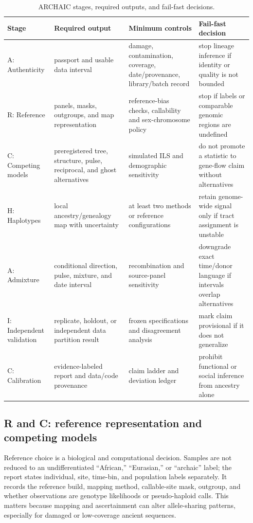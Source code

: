 \documentclass[conference]{IEEEtran}
\begin{document}
\begin{table}[t]
\caption{ARCHAIC stages, required outputs, and fail-fast decisions.}
\label{tab:stages}
\centering
\footnotesize
\begin{tabular}{L{0.11\textwidth} L{0.23\textwidth} L{0.29\textwidth} L{0.27\textwidth}}
\toprule
Stage & Required output & Minimum controls & Fail-fast decision \\
\midrule
A: Authenticity & passport and usable data interval & damage, contamination, coverage, date/provenance, library/batch record & stop lineage inference if identity or quality is not bounded \\
R: Reference & panels, masks, outgroups, and map representation & reference-bias checks, callability and sex-chromosome policy & stop if labels or comparable genomic regions are undefined \\
C: Competing models & preregistered tree, structure, pulse, reciprocal, and ghost alternatives & simulated ILS and demographic sensitivity & do not promote a statistic to gene-flow claim without alternatives \\
H: Haplotypes & local ancestry/genealogy map with uncertainty & at least two methods or reference configurations & retain genome-wide signal only if tract assignment is unstable \\
A: Admixture & conditional direction, pulse, mixture, and date interval & recombination and source-panel sensitivity & downgrade exact time/donor language if intervals overlap alternatives \\
I: Independent validation & replicate, holdout, or independent data partition result & frozen specifications and disagreement analysis & mark claim provisional if it does not generalize \\
C: Calibration & evidence-labeled report and data/code provenance & claim ladder and deviation ledger & prohibit functional or social inference from ancestry alone \\
\bottomrule
\end{tabular}
\end{table}

\subsection{R and C: reference representation and competing models}

Reference choice is a biological and computational decision. Samples are not reduced to an undifferentiated ``African,'' ``Eurasian,'' or ``archaic'' label; the report states individual, site, time-bin, and population labels separately. It records the reference build, mapping method, callable-site mask, outgroup, and whether observations are genotype likelihoods or pseudo-haploid calls. This matters because mapping and ascertainment can alter allele-sharing patterns, especially for damaged or low-coverage ancient sequences.
\end{document}
